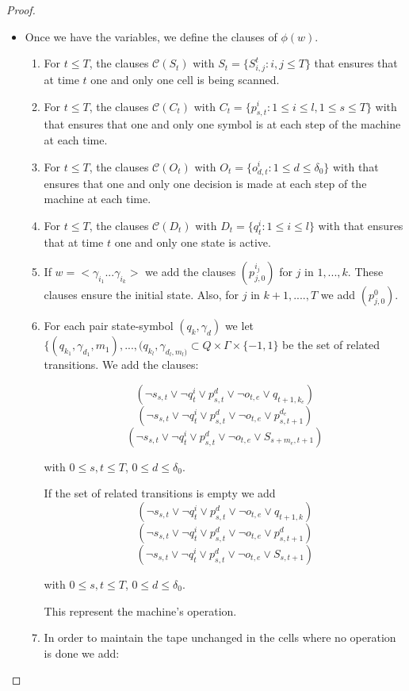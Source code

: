 \begin{proof}
\begin{itemize}
  \item Once we have the variables, we define the clauses of $\phi(w)$.
    \begin{enumerate}
    \item For $t\le T$, the clauses $\mathcal{C}(S_t)$ with $S_t = \{S_{i,j}^t : i,j \le T\}$  that ensures that at time $t$ one and only one cell is being scanned.
    \item  For $t\le T$, the clauses $\mathcal{C}(C_{t})$ with $C_t = \{p_{s,t}^{i} : 1\le i \le l, 1 \le s \le T\}$ with  that ensures that one and only one symbol is at each step of the machine at each time.
    \item  For $t\le T$, the clauses $\mathcal{C}(O_{t})$ with $O_t = \{o_{d,t}^{i} : 1\le d \le \delta_0\}$ with  that ensures that one and only one decision is made at each step of the machine at each time.
    \item For $t\le T$, the clauses $\mathcal{C}(D_{t})$ with $D_t = \{q_t^{i} : 1\le i \le l\}$ with  that ensures that at time $t$ one and only one state is active.
    \item If $w = <\gamma_{i_1}...\gamma_{i_k}>$ we add the clauses $(p_{j,0}^{i_j})$ for $j$ in $1,...,k$. These clauses ensure the initial state. Also, for $j$ in $k+1,....,T$ we add $(p_{j,0}^0)$.  
    \item For each pair state-symbol $(q_k,\gamma_d)$ we let $\{(q_{k_1} , \gamma_{d_1} , m_1 ), ... , (q_{k_l} , \gamma_{d_l , m_l)} \subset Q \times \Gamma \times \{-1,1\}$ be the set of related transitions. We add the clauses:

    \[
    (\neg s_{s,t} \lor \neg q_t^i  \lor p_{s,t}^d \lor \neg o_{t, e}  \lor q_{t+1, k_e})
    \]
    \[
(      \neg s_{s,t} \lor \neg q_t^i  \lor p_{s,t}^d \lor \neg o_{t, e}  \lor p_{s,t+1}^{d_e})
    \]
    \[
(      \neg s_{s,t} \lor \neg q_t^i  \lor p_{s,t}^d \lor \neg o_{t, e}  \lor S_{s+m_e, t+1})
    \]

    with $0 \le s,t \le T$, $0 \le d \le  \delta_0$. 

    If the set of related transitions is empty we add
    \[
    (\neg s_{s,t} \lor \neg q_t^i  \lor p_{s,t}^d \lor \neg o_{t, e}  \lor q_{t+1, k})
    \]
    \[
(      \neg s_{s,t} \lor \neg q_t^i  \lor p_{s,t}^d \lor \neg o_{t, e}  \lor p_{s,t+1}^{d})
    \]
    \[
(      \neg s_{s,t} \lor \neg q_t^i  \lor p_{s,t}^d \lor \neg o_{t, e}  \lor S_{s, t+1})
    \]

    with $0 \le s,t \le T$, $0 \le d \le  \delta_0$.
    
    This represent the machine's operation.
  \item In order to maintain the tape unchanged in the cells where no operation is done we add:


\end{enumerate}
\end{itemize}
\end{proof}
